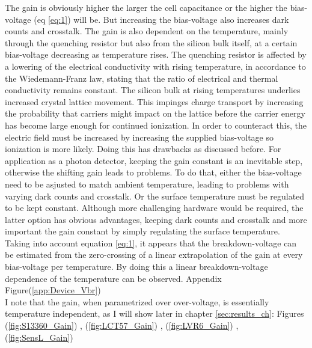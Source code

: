 \documentclass[12pt,article,type=msc,colorback,accentcolor=tud9c]{tudthesis}
\begin{document}
The gain is obviously higher the larger the cell capacitance or the higher the bias-voltage (eq \ref{eq:1}) will be. But increasing the bias-voltage also increases dark counts and crosstalk. 
The gain is also dependent on the temperature, mainly through the quenching resistor but also from the silicon bulk itself, at a certain bias-voltage decreasing as temperature rises. The quenching resistor is affected by a lowering of the electrical conductivity with rising temperature, in accordance to the Wiedemann-Franz law, stating that the ratio of electrical and thermal conductivity remains constant. The silicon bulk at rising temperatures underlies increased crystal lattice movement. This impinges charge transport by increasing the probability that carriers might impact on the lattice before the carrier energy has become large enough for continued ionization. In order to counteract this, the electric field must be increased by increasing the supplied bias-voltage so ionization is more likely. Doing this has drawbacks as discussed before. For application as a photon detector, keeping the gain constant is an inevitable step, otherwise the shifting gain leads to problems. To do that, either the bias-voltage need to be asjusted to match ambient temperature, leading to problems with varying dark counts and crosstalk. Or the surface temperature must be regulated to be kept constant. Although more challenging hardware would be required, the latter option has obvious advantages, keeping dark counts and crosstalk and more important the gain constant by simply regulating the surface temperature.\\
Taking into account equation \ref{eq:1}, it appears that the breakdown-voltage can be estimated from the zero-crossing of a linear extrapolation of the gain at every bias-voltage per temperature. By doing this a linear breakdown-voltage dependence of the temperature can be observed. Appendix Figure(\ref{app:Device_Vbr})\\
I note that the gain, when parametrized over over-voltage, is essentially temperature independent, as I will show later in chapter {\ref{sec:results_ch}}: Figures (\ref{fig:S13360_Gain}) , (\ref{fig:LCT57_Gain}) , (\ref{fig:LVR6_Gain}) , (\ref{fig:SensL_Gain})\\
\end{document}
